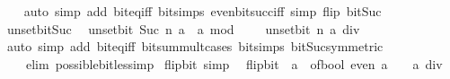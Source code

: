 \begin{isabellebody}
%
\isadelimproof
\ \ %
\endisadelimproof
%
\isatagproof
{}\isamarkupfalse%
\ {\isacharparenleft}{\kern0pt}auto\ simp\ add{\isacharcolon}{\kern0pt}\ bit{\isacharunderscore}{\kern0pt}eq{\isacharunderscore}{\kern0pt}iff\ bit{\isacharunderscore}{\kern0pt}simps\ even{\isacharunderscore}{\kern0pt}bit{\isacharunderscore}{\kern0pt}succ{\isacharunderscore}{\kern0pt}iff\ simp\ flip{\isacharcolon}{\kern0pt}\ bit{\isacharunderscore}{\kern0pt}Suc{\isacharparenright}{\kern0pt}%
\endisatagproof
{\isafoldproof}%
%
\isadelimproof
\isanewline
%
\endisadelimproof
\isanewline
{}\isamarkupfalse%
\ unset{\isacharunderscore}{\kern0pt}bit{\isacharunderscore}{\kern0pt}Suc{\isacharcolon}{\kern0pt}\isanewline
\ \ {\isacartoucheopen}unset{\isacharunderscore}{\kern0pt}bit\ {\isacharparenleft}{\kern0pt}Suc\ n{\isacharparenright}{\kern0pt}\ a\ {\isacharequal}{\kern0pt}\ a\ mod\ {}\ {\isacharplus}{\kern0pt}\ {}\ {\isacharasterisk}{\kern0pt}\ unset{\isacharunderscore}{\kern0pt}bit\ n\ {\isacharparenleft}{\kern0pt}a\ div\ {}{\isacharparenright}{\kern0pt}{\isacartoucheclose}\isanewline
%
\isadelimproof
\ \ %
\endisadelimproof
%
\isatagproof
{}\isamarkupfalse%
\ {\isacharparenleft}{\kern0pt}auto\ simp\ add{\isacharcolon}{\kern0pt}\ bit{\isacharunderscore}{\kern0pt}eq{\isacharunderscore}{\kern0pt}iff\ bit{\isacharunderscore}{\kern0pt}sum{\isacharunderscore}{\kern0pt}mult{\isacharunderscore}{\kern0pt}{}{\isacharunderscore}{\kern0pt}cases\ bit{\isacharunderscore}{\kern0pt}simps\ bit{\isacharunderscore}{\kern0pt}Suc{\isacharbrackleft}{\kern0pt}symmetric{\isacharbrackright}{\kern0pt}\isanewline
\ \ \ \ elim{\isacharcolon}{\kern0pt}\ possible{\isacharunderscore}{\kern0pt}bit{\isacharunderscore}{\kern0pt}less{\isacharunderscore}{\kern0pt}imp{\isacharparenright}{\kern0pt}%
\endisatagproof
{\isafoldproof}%
%
\isadelimproof
\isanewline
%
\endisadelimproof
\isanewline
{}\isamarkupfalse%
\ flip{\isacharunderscore}{\kern0pt}bit{\isacharunderscore}{\kern0pt}{}\ {\isacharbrackleft}{\kern0pt}simp{\isacharbrackright}{\kern0pt}{\isacharcolon}{\kern0pt}\isanewline
\ \ {\isacartoucheopen}flip{\isacharunderscore}{\kern0pt}bit\ {}\ a\ {\isacharequal}{\kern0pt}\ of{\isacharunderscore}{\kern0pt}bool\ {\isacharparenleft}{\kern0pt}even\ a{\isacharparenright}{\kern0pt}\ {\isacharplus}{\kern0pt}\ {}\ {\isacharasterisk}{\kern0pt}\ {\isacharparenleft}{\kern0pt}a\ div\ {}{\isacharparenright}{\kern0pt}{\isacartoucheclose}\isanewline
%
\isadelimproof
\ \ %
\endisadelimproof

\end{isabellebody}
